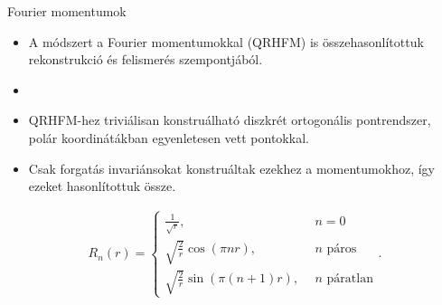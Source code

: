 \documentclass{beamer}
\begin{document}
\begin{frame}{Fourier momentumok}
\begin{small}
    \vskip 10mm
    \begin{itemize}
    \item A módszert a Fourier momentumokkal (QRHFM) is összehasonlítottuk rekonstrukció és felismerés szempontjából.
    \item \vskip -3mm 

    \item QRHFM-hez triviálisan konstruálható diszkrét ortogonális pontrendszer, polár koordinátákban egyenletesen vett pontokkal.

    \item Csak forgatás invariánsokat konstruáltak ezekhez a momentumokhoz, így ezeket hasonlítottuk össze.
    \end{itemize}
    \vskip -2mm
    \begin{gather*}
        R_n(r) = \begin{cases}
            \frac{1}{\sqrt{r}}, &n = 0\\
            \sqrt{\frac{2}{r}}\cos(\pi n r), &n \text{ páros}\\
            \sqrt{\frac{2}{r}}\sin(\pi (n+1) r), \ \ &n \text{ páratlan}
        \end{cases}.
    \end{gather*}
\end{small}
\end{frame}
\end{document}
